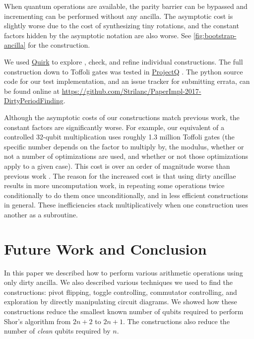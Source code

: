 \documentclass[twocolumn,longbibliography]{quantumarticle-customized}
\begin{document}
When quantum operations are available, the parity barrier can be bypassed and incrementing can be performed without any ancilla.
The asymptotic cost is slightly worse due to the cost of synthesizing tiny rotations, and the constant factors hidden by the asymptotic notation are also worse.
See \autoref{fig:bootstrap-ancilla} for the construction.

We used \href{https://github.com/Strilanc/Quirk}{Quirk} \cite{quirk2016} to explore \cite{victor2013}, check, and refine individual constructions.
The full construction down to Toffoli gates was tested in \href{https://github.com/ProjectQ-Framework/ProjectQ}{ProjectQ} \cite{projq2016}.
The python source code for our test implementation, and an issue tracker for submitting errata, can be found online at \href{https://github.com/Strilanc/PaperImpl-2017-DirtyPeriodFinding}{https://github.com/Strilanc/PaperImpl-2017-DirtyPeriodFinding}.

Although the asymptotic costs of our constructions match previous work, the constant factors are significantly worse.
For example, our equivalent of a controlled 32-qubit multiplication uses roughly 1.3 million Toffoli gates (the specific number depends on the factor to multiply by, the modulus, whether or not a number of optimizations are used, and whether or not those optimizations apply to a given case).
This cost is over an order of magnitude worse than previous work \cite{haner2016}.
The reason for the increased cost is that using dirty ancillae results in more uncomputation work, in repeating some operations twice conditionally to do them once unconditionally, and in less efficient constructions in general.
These inefficiencies stack multiplicatively when one construction uses another as a subroutine.


\section{Future Work and Conclusion} \label{sec:conclusion}

In this paper we described how to perform various arithmetic operations using only dirty ancilla.
We also described various techniques we used to find the constructions: pivot flipping, toggle controlling, commutator controlling, and exploration by directly manipulating circuit diagrams.
We showed how these constructions reduce the smallest known number of qubits required to perform Shor's algorithm from $2n+2$ to $2n+1$.
The constructions also reduce the number of {\em clean} qubits required by $n$.
\end{document}
